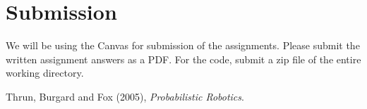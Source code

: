 \documentclass[tp]{lcc}
\begin{document}
\section{Submission}
We will be using the Canvas for submission of the assignments. Please submit the written assignment answers as a PDF. For the code, submit a zip file of the entire working directory.

\begin{thebibliography}{9}
Thrun, Burgard and Fox (2005), \textit{Probabilistic Robotics}.
\end{thebibliography}
\end{document}
